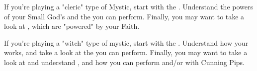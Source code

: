 \begin{multicols*}{2}
If you're playing a "cleric" type of Mystic, start with the . Understand the powers of your Small God's  and the  you can perform. Finally, you may want to take a look at , which are "powered" by your Faith.

\cbreak


If you're playing a "witch" type of mystic, start with the . Understand how your  works, and take a look at the  you can perform. Finally, you may want to take a look at and understand , and how you can perform  and/or  with Cunning Pips.

\end{multicols*}
